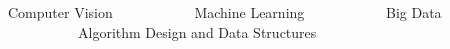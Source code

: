 

\begin{cventries}

\bullet\ Computer Vision
\ \ \ \ \ \ \ \ \ \ 
\bullet\ Machine Learning
\ \ \ \ \ \ \ \ \ \ 
\bullet\ Big Data
\ \ \ \ \ \ \ \ \ \ 
\bullet\ Algorithm Design and Data Structures

\end{cventries}
